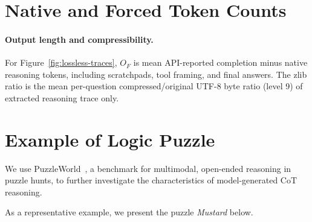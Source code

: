 \section{Native and Forced Token Counts}


\label{app:native-forced-tokens}

\paragraph{Output length and compressibility.}
For Figure~\ref{fig:lossless-traces}, $O_F$ is mean API-reported completion minus native reasoning tokens, including scratchpads, tool framing, and final answers.
The zlib ratio is the mean per-question compressed/original UTF-8 byte ratio (level 9) of extracted reasoning trace only.







\section{Example of Logic Puzzle}\label{appendix_realcase}
We use PuzzleWorld~\citep{li2026puzzleworld}, a benchmark for multimodal, open-ended reasoning in puzzle hunts, to further investigate the characteristics of model-generated CoT reasoning.

As a representative example, we present the puzzle \textit{Mustard} below.


